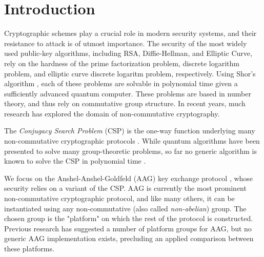 \section{Introduction}
\label{sec:intro}

Cryptographic schemes play a crucial role in modern security systems, and their resistance to attack is of utmost importance. The security of the most widely used public-key algorithms, including RSA, Diffie-Hellman, and Elliptic Curve, rely on the hardness of the prime factorization problem, discrete logarithm problem, and elliptic curve discrete logaritm problem, respectively. Using Shor's algorithm \cite{shor_algo}, each of these problems are solvable in polynomial time given a sufficiently advanced quantum computer. These problems are based in number theory, and thus rely on commutative group structure. In recent years, much research has explored the domain of non-commutative cryptography.

The \emph{Conjugacy Search Problem} (CSP) is the one-way function underlying many non-commutative cryptographic protocols . While quantum algorithms have been presented to solve many group-theoretic problems, so far no generic algorithm is known to solve the CSP in polynomial time \cite{polycyclic_survey}. 

We focus on the Anshel-Anshel-Goldfeld (AAG) key exchange protocol \cite{aag}, whose security relies on a variant of the CSP. AAG is currently the most prominent non-commutative cryptographic protocol, and like many others, it can be instantiated using any non-commutative (also called \emph{non-abelian}) group. The chosen group is the "platform" on which the rest of the protocol is constructed. Previous research has suggested a number of platform groups for AAG, but no generic AAG implementation exists, precluding an applied comparison between these platforms.

